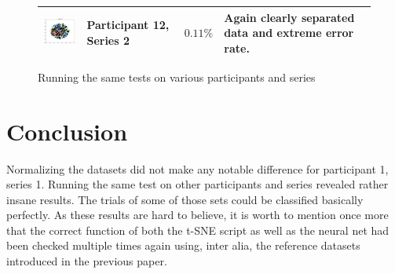 \documentclass{article} %
\begin{document}
\begin{figure}
\begin{tabular}{|m{3cm}|m{2.2cm}|m{1cm}|m{8cm}|}
		\hline \rule{0pt}{15ex}\includegraphics[width=3cm]{eegP12S2.jpg} & Participant 12, Series 2 & $0.11\%$ & Again clearly separated data and extreme error rate. \\ 
		\hline 
	\end{tabular}
	\label{tbl:tests}
	\caption{Running the same tests on various participants and series}
\end{figure}


\section{Conclusion}
Normalizing the datasets did not make any notable difference for participant 1, series 1. Running the same test on other participants and series revealed rather insane results. The trials of some of those sets could be classified basically perfectly. As these results are hard to believe, it is worth to mention once more that the correct function of both the t-SNE script as well as the neural net had been checked multiple times again using, inter alia, the reference datasets introduced in the previous paper.
\end{document}
